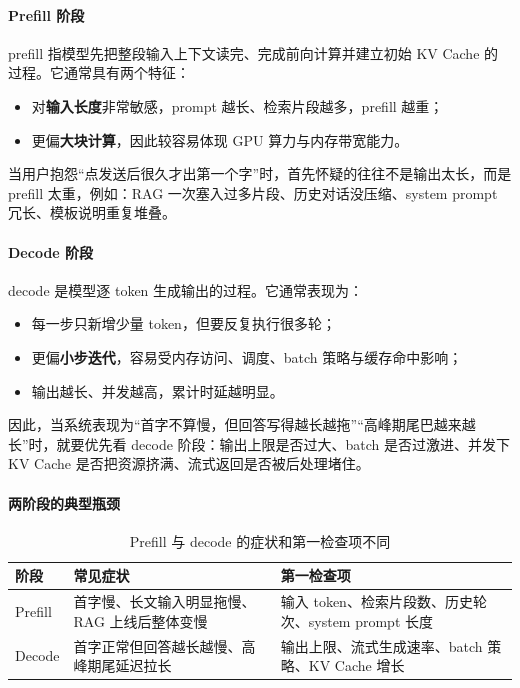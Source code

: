 \paragraph{Prefill 阶段}
prefill 指模型先把整段输入上下文读完、完成前向计算并建立初始 KV Cache 的过程。它通常具有两个特征：
\begin{itemize}
  \item 对\textbf{输入长度}非常敏感，prompt 越长、检索片段越多，prefill 越重；
  \item 更偏\textbf{大块计算}，因此较容易体现 GPU 算力与内存带宽能力。
\end{itemize}

当用户抱怨“点发送后很久才出第一个字”时，首先怀疑的往往不是输出太长，而是 prefill 太重，例如：RAG 一次塞入过多片段、历史对话没压缩、system prompt 冗长、模板说明重复堆叠。

\paragraph{Decode 阶段}
decode 是模型逐 token 生成输出的过程。它通常表现为：
\begin{itemize}
  \item 每一步只新增少量 token，但要反复执行很多轮；
  \item 更偏\textbf{小步迭代}，容易受内存访问、调度、batch 策略与缓存命中影响；
  \item 输出越长、并发越高，累计时延越明显。
\end{itemize}

因此，当系统表现为“首字不算慢，但回答写得越长越拖”“高峰期尾巴越来越长”时，就要优先看 decode 阶段：输出上限是否过大、batch 是否过激进、并发下 KV Cache 是否把资源挤满、流式返回是否被后处理堵住。

\paragraph{两阶段的典型瓶颈}
\begin{table}[H]
\centering
\small
\begin{tabularx}{\textwidth}{>{\raggedright\arraybackslash}p{2.6cm}>{\raggedright\arraybackslash}p{4cm}>{\raggedright\arraybackslash}X}
\toprule
\textbf{阶段} & \textbf{常见症状} & \textbf{第一检查项} \\
\midrule
Prefill & 首字慢、长文输入明显拖慢、RAG 上线后整体变慢 & 输入 token、检索片段数、历史轮次、system prompt 长度 \\
Decode & 首字正常但回答越长越慢、高峰期尾延迟拉长 & 输出上限、流式生成速率、batch 策略、KV Cache 增长 \\
\bottomrule
\end{tabularx}
\caption{Prefill 与 decode 的症状和第一检查项不同}
\label{tab:prefill-decode-bottleneck}
\end{table}

